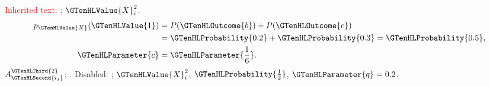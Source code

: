 \makeatletter
{}
\makeatother



\textcolor{red}{Inherited text: ; $\GTenHLValue{X}_i^2$}.
\[
\begin{aligned}
p_{\GTenHLValue{X}}(\GTenHLValue{1})&=P(\GTenHLOutcome{b})+P(\GTenHLOutcome{c})\\
&=\GTenHLProbability{0.2}+\GTenHLProbability{0.3}=\GTenHLProbability{0.5},\\
\GTenHLParameter{c}&=\GTenHLParameter{\frac{1}{6}}.
\end{aligned}
\]
$A_{\GTenHLSecond{i_j}}^{\GTenHLThird{2}}$; .
\GTenHighlightsfalse
Disabled: ; $\GTenHLValue{X}_i^2$,
$\GTenHLProbability{\frac{1}{2}}$, $\GTenHLParameter{q}=0.2$.

